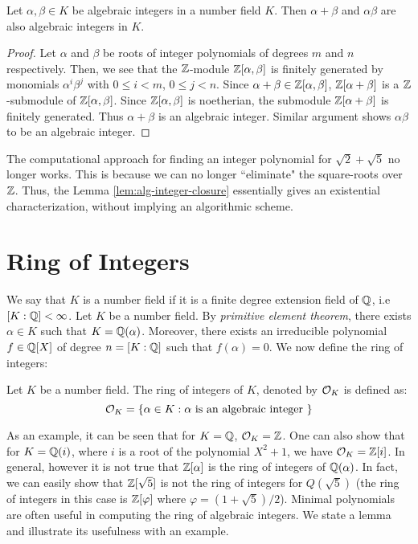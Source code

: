\documentclass[11pt]{article}
\begin{document}
\begin{lemma}\label{lem:alg-integer-closure}
Let $\alpha,\beta\in K$ be algebraic integers in a number field $K$. Then $\alpha+\beta$ and $\alpha\beta$
are also algebraic integers in $K$.
\end{lemma}
\begin{proof}
Let $\alpha$ and $\beta$ be roots of integer polynomials of degrees $m$ and $n$ respectively. Then, we see
that the $\mathbb{Z}$-module $\mathbb{Z}[\alpha,\beta]$ is finitely generated by monomials $\alpha^i\beta^j$ with $0\leq i<m$,
$0\leq j<n$. Since $\alpha+\beta\in \mathbb{Z}[\alpha,\beta]$, $\mathbb{Z}[\alpha+\beta]$ is a $\mathbb{Z}$-submodule of
$\mathbb{Z}[\alpha,\beta]$. Since $\mathbb{Z}[\alpha,\beta]$ is noetherian, the submodule $\mathbb{Z}[\alpha+\beta]$ is finitely generated.
Thus $\alpha+\beta$ is an algebraic integer. Similar argument shows $\alpha\beta$ to be an algebraic integer.
\end{proof}

The computational approach for finding an integer polynomial for $\sqrt{2}+\sqrt{5}$ no longer works. This is
because we can no longer ``eliminate" the square-roots over $\mathbb{Z}$. Thus, the Lemma \ref{lem:alg-integer-closure}
essentially gives an existential characterization, without implying an algorithmic scheme.

\section{Ring of Integers}\label{sec:ring-of-integers}
We say that $K$ is a number field if it is a finite degree extension field of $\mathbb{Q}$, i.e $[K:\mathbb{Q}] < \infty$.
Let $K$ be a number field. By {\em primitive element theorem}, there exists $\alpha\in K$ such that
$K=\mathbb{Q}(\alpha)$. Moreover, there exists an irreducible polynomial $f\in\mathbb{Q}[X]$ of degree $n=[K:\mathbb{Q}]$ such
that $f(\alpha)=0$. We now define the ring of integers:

\begin{definition}\label{defn:ring-of-integers}
Let $K$ be a number field. The ring of integers of $K$, denoted by $\mathcal{O}_{K}$ is defined as:
\begin{equation*}
\mathcal{O}_{K} = \{\alpha \in K: \alpha \text{ is an algebraic integer }\}
\end{equation*}
\end{definition}
As an example, it can be seen that for $K=\mathbb{Q}$, $\mathcal{O}_{K}=\mathbb{Z}$. One can also show that for
$K=\mathbb{Q}(i)$, where $i$ is a root of the polynomial $X^2+1$, we have $\mathcal{O}_{K}=\mathbb{Z}[i]$. In general,
however it is not true that $\mathbb{Z}[\alpha]$ is the ring of integers of $\mathbb{Q}(\alpha)$. In fact,
we can easily show that $\mathbb{Z}[\sqrt{5}]$ is not the ring of integers for $Q(\sqrt{5})$ (the
ring of integers in this case is $\mathbb{Z}[\varphi]$ where $\varphi=(1+\sqrt{5})/2$). Minimal
polynomials are often useful in computing the ring of algebraic integers. We state a lemma
and illustrate its usefulness with an example.
\end{document}
